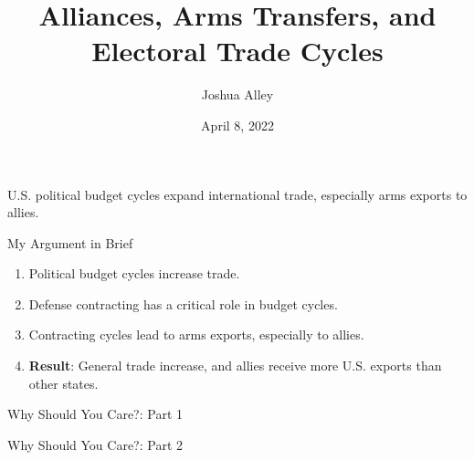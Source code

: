 \documentclass[12pt]{beamer}
\title{Alliances, Arms Transfers, and Electoral Trade Cycles}
\date{April 8, 2022}
\author{Joshua Alley}
\institute{Democratic Statecraft Lab, University of Virginia}
\begin{document}
 \maketitle



 \begin{frame}[standout]

U.S. political budget cycles expand international trade, especially arms exports to allies. 


 \end{frame}
 

\begin{frame}{My Argument in Brief}

\begin{enumerate}
\item Political budget cycles increase trade.  
\pause 
\item Defense contracting has a critical role in budget cycles.
\pause 
\item Contracting cycles lead to arms exports, especially to allies. 
\pause
\item \textbf{Result}: General trade increase, and allies receive more U.S. exports than other states. 
\end{enumerate}

\end{frame}
 

\begin{frame}{Why Should You Care?: Part 1}



\end{frame}
 

\begin{frame}{Why Should You Care?: Part 2}



\end{frame}
\end{document}
